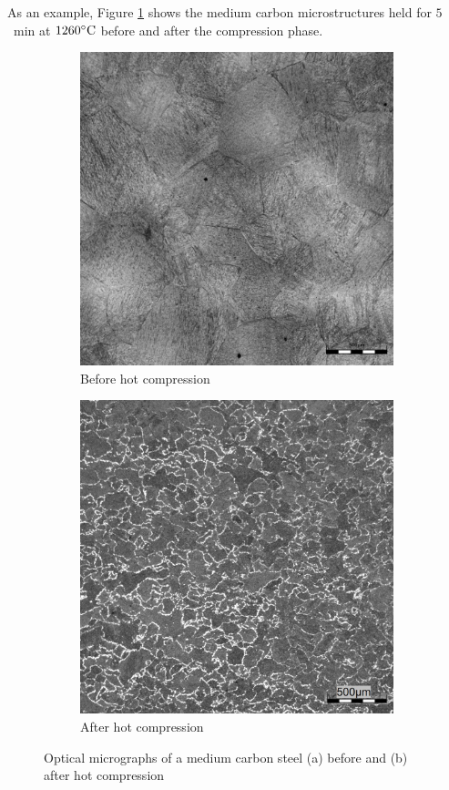 \documentclass[metals,article,submit,pdftex,moreauthors]{Definitions/mdpi}
\begin{document}
As an example, Figure \ref{fig:Micrography} shows the medium carbon microstructures held for $5$~min at $1260\celsius$ before and after the compression phase.
\begin{figure}[!ht]
\centering
\begin{subfigure}[b]{0.45\columnwidth}
\centering
\includegraphics[width=\columnwidth]{Figures/BeforeCompM}
\caption{Before hot compression}
\end{subfigure}
\hfill
\begin{subfigure}[b]{0.45\columnwidth}
\centering
\includegraphics[width=\columnwidth]{Figures/AfterCompM}
\caption{After hot compression}
\end{subfigure}
\caption{Optical micrographs of a medium carbon steel (a) before and (b) after hot compression}
\label{fig:Micrography}
\end{figure}
\end{document}
